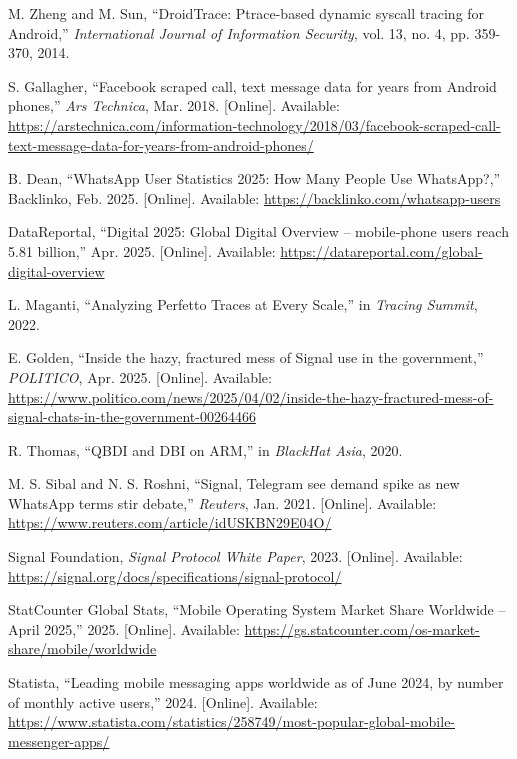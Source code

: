 \documentclass[a4paper,12pt]{report}
\begin{document}
\begin{thebibliography}{99}
M. Zheng and M. Sun, “DroidTrace: Ptrace-based dynamic syscall tracing for Android,” \emph{International Journal of Information Security}, vol. 13, no. 4, pp. 359-370, 2014.

S. Gallagher, “Facebook scraped call, text message data for years from Android phones,” \emph{Ars Technica}, Mar. 2018. [Online]. Available: \url{https://arstechnica.com/information-technology/2018/03/facebook-scraped-call-text-message-data-for-years-from-android-phones/}

B. Dean, “WhatsApp User Statistics 2025: How Many People Use WhatsApp?,” Backlinko, Feb. 2025. [Online]. Available: \url{https://backlinko.com/whatsapp-users}

DataReportal, “Digital 2025: Global Digital Overview – mobile‐phone users reach 5.81 billion,” Apr. 2025. [Online]. Available: \url{https://datareportal.com/global-digital-overview}

L. Maganti, “Analyzing Perfetto Traces at Every Scale,” in \emph{Tracing Summit}, 2022.

E. Golden, “Inside the hazy, fractured mess of Signal use in the government,” \emph{POLITICO}, Apr. 2025. [Online]. Available: \url{https://www.politico.com/news/2025/04/02/inside-the-hazy-fractured-mess-of-signal-chats-in-the-government-00264466}

R. Thomas, “QBDI and DBI on ARM,” in \emph{BlackHat Asia}, 2020.

M. S. Sibal and N. S. Roshni, “Signal, Telegram see demand spike as new WhatsApp terms stir debate,” \emph{Reuters}, Jan. 2021. [Online]. Available: \url{https://www.reuters.com/article/idUSKBN29E04O/}

Signal Foundation, \emph{Signal Protocol White Paper}, 2023. [Online]. Available: \url{https://signal.org/docs/specifications/signal-protocol/}

StatCounter Global Stats, “Mobile Operating System Market Share Worldwide – April 2025,” 2025. [Online]. Available: \url{https://gs.statcounter.com/os-market-share/mobile/worldwide}

Statista, “Leading mobile messaging apps worldwide as of June 2024, by number of monthly active users,” 2024. [Online]. Available: \url{https://www.statista.com/statistics/258749/most-popular-global-mobile-messenger-apps/}


\end{thebibliography}
\end{document}
